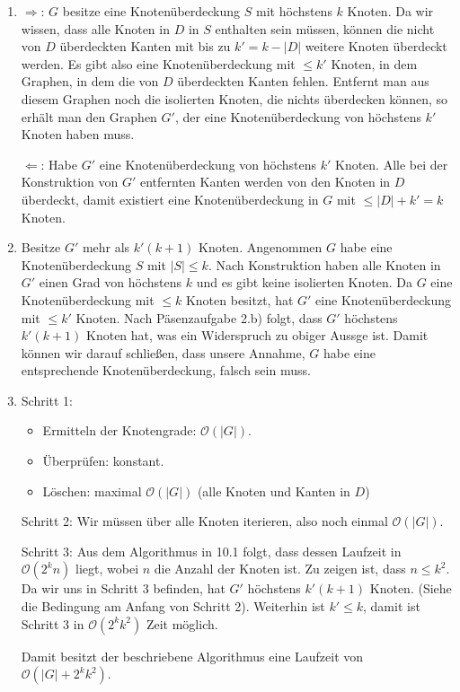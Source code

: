 \documentclass[a4paper]{scrartcl}
\newcommand{\Oh}{\mathcal{O}}
\begin{document}
\begin{enumerate}[label=\bfseries \arabic*.]
\begin{enumerate}
    \item %
        $\Rightarrow$:
        $G$ besitze eine Knotenüberdeckung $S$ mit höchstens $k$ Knoten.
        Da wir wissen, dass alle Knoten in $D$ in $S$ enthalten sein müssen,
        können die nicht von $D$ überdeckten Kanten mit bis zu $k' = k - |D|$
        weitere Knoten überdeckt werden.
        Es gibt also eine Knotenüberdeckung mit $\leq k'$ Knoten, in dem
        Graphen, in dem die von $D$ überdeckten Kanten fehlen.
        Entfernt man aus diesem Graphen noch die isolierten Knoten, die nichts
        überdecken können, so erhält man den Graphen $G'$, der eine
        Knotenüberdeckung von höchstens $k'$ Knoten haben muss.

        $\Leftarrow$:
        Habe $G'$ eine Knotenüberdeckung von höchstens $k'$ Knoten.
        Alle bei der Konstruktion von $G'$ entfernten Kanten werden von den
        Knoten in $D$ überdeckt, damit existiert eine Knotenüberdeckung in $G$
        mit $\leq |D| + k' = k$ Knoten.

    \item %
        Besitze $G'$ mehr als $k'(k+1)$ Knoten.
        Angenommen $G$ habe eine Knotenüberdeckung $S$ mit $|S| \leq k$.
        Nach Konstruktion haben alle Knoten in $G'$ einen Grad von höchstens
        $k$ und es gibt keine isolierten Knoten.
        Da $G$ eine Knotenüberdeckung mit $\leq k$ Knoten besitzt, hat $G'$
        eine Knotenüberdeckung mit $\leq k'$ Knoten.
        Nach Päsenzaufgabe 2.b) folgt, dass $G'$ höchstens $k'(k+1)$ Knoten hat,
        was ein Widerspruch zu obiger Aussge ist. Damit können wir darauf
        schließen, dass unsere Annahme, $G$ habe eine entsprechende
        Knotenüberdeckung, falsch sein muss.



    \item %
        Schritt 1:
        \begin{itemize}
            \item Ermitteln der Knotengrade: $\Oh(|G|)$.
            \item Überprüfen: konstant.
            \item Löschen: maximal $\Oh(|G|)$ (alle Knoten und Kanten in $D$)
        \end{itemize}

        Schritt 2:
        Wir müssen über alle Knoten iterieren, also noch einmal $\Oh(|G|)$.

        Schritt 3:
        Aus dem Algorithmus in 10.1 folgt, dass dessen Laufzeit in $\Oh(2^k n)$ liegt,
        wobei $n$ die Anzahl der Knoten ist. Zu zeigen ist, dass $n \leq k^2$.
        Da wir uns in Schritt 3 befinden, hat $G'$ höchstens $k'(k+1)$ Knoten.
        (Siehe die Bedingung am Anfang von Schritt 2).
        Weiterhin ist $k' \leq k$, damit ist Schritt 3 in $\Oh(2^kk^2)$ Zeit möglich.

        Damit besitzt der beschriebene Algorithmus eine Laufzeit von
        $\Oh(|G| + 2^kk^2)$.

\end{enumerate}
\end{enumerate}
\end{document}
